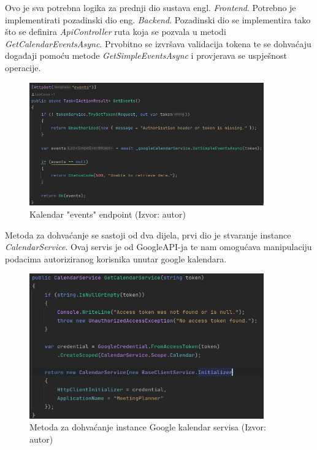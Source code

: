 \documentclass{foi}
\begin{document}
Ovo je sva potrebna logika za prednji dio sustava {engl. \textit{Frontend}}. Potrebno je implementirati pozadinski dio {eng. \textit{Backend}}.
Pozadinski dio se implementira tako što se definira \textit{ApiController} ruta koja se pozvala u metodi \textit{GetCalendarEventsAsync}. 
Prvobitno se izvršava validacija tokena te se dohvaćaju događaji pomoću metode \textit{GetSimpleEventsAsync} i provjerava se uspješnost operacije.
\begin{figure}[H]
    \centering
    \includegraphics[width=0.9\textwidth]{slike/GetCalendarEventsEndpoint.png}
    \caption{Kalendar "events" endpoint (Izvor: autor)}
    \label{fig:GetCalendarEventsEndpoint}

\end{figure}
Metoda za dohvaćanje se sastoji od dva dijela, prvi dio je stvaranje instance \textit{CalendarService}. Ovaj servis je od GoogleAPI-ja te nam omogućava manipulaciju podacima autoriziranog korisnika unutar google kalendara.
\begin{figure}[H]
    \centering
    \includegraphics[width=0.9\textwidth]{slike/GetCalendarService.png}
    \caption{Metoda za dohvaćanje instance Google kalendar servisa (Izvor: autor)}
    \label{fig:GetCalendarService}

\end{figure}
\end{document}
